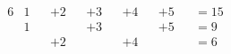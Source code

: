 \documentclass[nofonts]{ctexart}
\begin{document}
\begin{alignat*}{6}
	&1 & &+2 & &+3 & &+4 & &+5 & &=15	\\
	&1 & &   & &+3 & &   & &+5 & &=9	\\
	&  & &+2 & &   & &+4 & &   & &=6
\end{alignat*}
\end{document}
